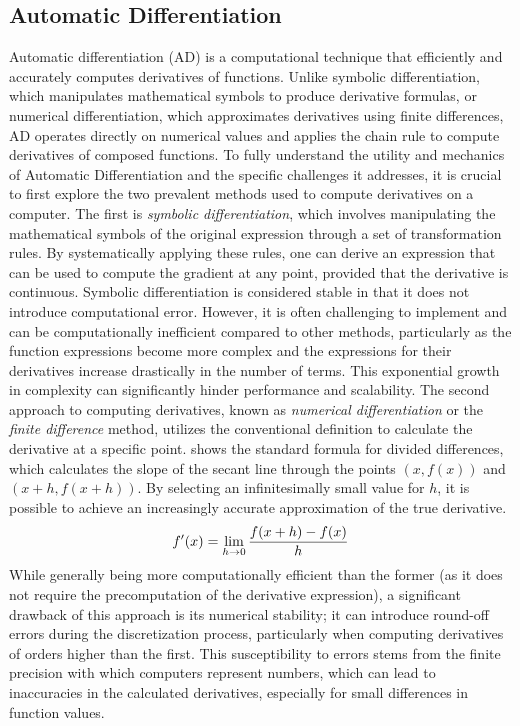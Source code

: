 \subsection{Automatic Differentiation}
Automatic differentiation (AD) is a computational technique that efficiently
and accurately computes derivatives of functions. Unlike symbolic
differentiation, which manipulates mathematical symbols to produce derivative
formulas, or numerical differentiation, which approximates derivatives using
finite differences, AD operates directly on numerical values and applies the
chain rule to compute derivatives of composed functions. To fully understand
the utility and mechanics of Automatic Differentiation and the specific
challenges it addresses, it is crucial to first explore the two prevalent
methods used to compute derivatives on a computer. The first is \emph{symbolic
differentiation}, which involves manipulating the mathematical symbols of the
original expression through a set of transformation rules.
By systematically applying these rules, one can derive an expression that can
be used to compute the gradient at any point, provided that the derivative is
continuous. Symbolic differentiation is considered stable in that it does not
introduce computational error. However, it is often challenging to implement
and can be computationally inefficient compared to other methods, particularly
as the function expressions become more complex and the expressions for their
derivatives increase drastically in the number of terms. This exponential
growth in complexity can significantly hinder performance and scalability.
The second approach to computing derivatives, known as \emph{numerical
differentiation} or the \emph{finite difference} method, utilizes the
conventional definition to calculate the derivative at
a specific point.  shows the standard formula for divided
differences, which calculates the slope of the secant line through the points
$(x,f(x))$ and $(x+h,f(x+h))$. By selecting an infinitesimally small value for
$h$, it is possible to achieve an increasingly accurate approximation of the
true derivative.
\begin{equation}
    \labeq{2_4}
    f'(x) = \lim_{h \to 0} \frac{f(x + h) - f(x)}{h}
\end{equation}
While generally being more computationally efficient than the former (as it
does not require the precomputation of the derivative expression), a
significant drawback of this approach is its numerical stability; it can
introduce round-off errors during the discretization process, particularly when
computing derivatives of orders higher than the first. This susceptibility to
errors stems from the finite precision with which computers represent numbers,
which can lead to inaccuracies in the calculated derivatives, especially for
small differences in function values.

